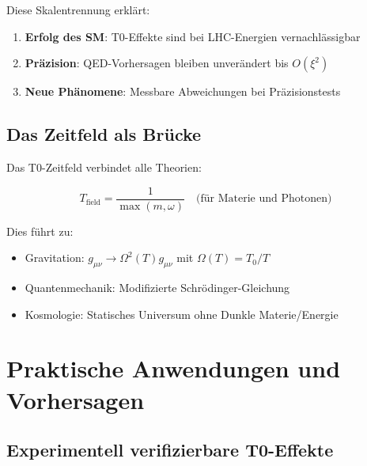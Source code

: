 	Diese Skalentrennung erklärt:
	\begin{enumerate}
		\item \textbf{Erfolg des SM}: T0-Effekte sind bei LHC-Energien vernachlässigbar
		\item \textbf{Präzision}: QED-Vorhersagen bleiben unverändert bis $O(\xi^2)$
		\item \textbf{Neue Phänomene}: Messbare Abweichungen bei Präzisionstests
	\end{enumerate}
	
	\subsection{Das Zeitfeld als Brücke}
	
	Das T0-Zeitfeld verbindet alle Theorien:
	
	\begin{equation}
		T_{\text{field}} = \frac{1}{\max(m, \omega)} \quad \text{(für Materie und Photonen)}
	\end{equation}
	
	Dies führt zu:
	\begin{itemize}
		\item Gravitation: $g_{\mu\nu} \to \Omega^2(T) g_{\mu\nu}$ mit $\Omega(T) = T_0/T$
		\item Quantenmechanik: Modifizierte Schrödinger-Gleichung
		\item Kosmologie: Statisches Universum ohne Dunkle Materie/Energie
	\end{itemize}
	
	\section{Praktische Anwendungen und Vorhersagen}
	
	\subsection{Experimentell verifizierbare T0-Effekte}
	
	\begin{table}[h]
		\centering
		\caption{T0-Vorhersagen vs. Standard-Modell}
	\end{table}
	
